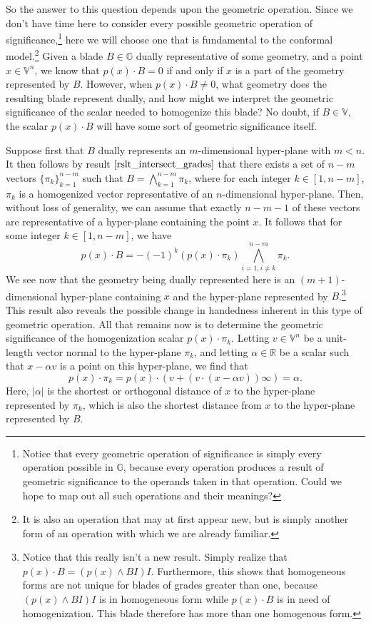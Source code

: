 \documentclass[12pt]{article}
\newcommand{\G}{\mathbb{G}}
\newcommand{\V}{\mathbb{V}}
\newcommand{\R}{\mathbb{R}}
\newcommand{\nvai}{\infty}
\begin{document}
So the answer to this question depends upon the geometric operation.
Since we don't have time here to consider every possible geometric
operation of significance,\footnote{Notice that every geometric operation
of significance is simply every operation possible in $\G$, because every operation
produces a result of geometric significance to the operands taken in that operation.
Could we hope to map out all such operations and their meanings?}
here we will choose one that is fundamental
to the conformal model.\footnote{It is also an operation that may at
first appear new, but is simply another form of an operation with which we
are already familiar.}
Given a blade $B\in\G$ dually representative
of some geometry, and a point $x\in\V^n$, we know that $p(x)\cdot B=0$
if and only if $x$ is a part of the geometry represented by $B$.  However,
when $p(x)\cdot B\neq 0$, what geometry does the resulting blade represent dually,
and how might we interpret the geometric significance of the scalar needed to
homogenize this blade?  No doubt, if $B\in\V$, the scalar $p(x)\cdot B$ will
have some sort of geometric significance itself.

Suppose first that $B$ dually represents an $m$-dimensional
hyper-plane with $m<n$.  It then follows by result $\eqref{rslt_intersect_grades}$
that there exists a set of $n-m$ vectors $\{\pi_k\}_{k=1}^{n-m}$
such that $B=\bigwedge_{k=1}^{n-m}\pi_k$, where for each integer
$k\in[1,n-m]$, $\pi_k$ is a homogenized vector representative
of an $n$-dimensional hyper-plane.  Then, without loss of generality,
we can assume that exactly $n-m-1$ of these vectors are representative
of a hyper-plane containing the point $x$.
It follows that for some integer $k\in[1,n-m]$, we have
\begin{equation*}
p(x)\cdot B = -(-1)^k (p(x)\cdot \pi_k)\bigwedge_{i=1,i\neq k}^{n-m} \pi_k.
\end{equation*}
We see now that the geometry being dually represented here is an
$(m+1)$-dimensional hyper-plane containing $x$ and
the hyper-plane represented by $B$.\footnote{Notice that this really isn't a new result.
Simply realize that $p(x)\cdot B = (p(x)\wedge BI)I$.  Furthermore, this shows that
homogeneous forms are not unique for blades of grades greater than one, because $(p(x)\wedge BI)I$ is in homogeneous
form while $p(x)\cdot B$ is in need of homogenization.  This blade therefore has more than one homogenous form.}
This result also reveals the possible
change in handedness inherent in this type of geometric operation.  All that remains now is to determine
the geometric significance of the homogenization scalar $p(x)\cdot\pi_k$.
Letting $v\in\V^n$ be a unit-length vector
normal to the hyper-plane $\pi_k$, and letting $\alpha\in\R$ be a scalar such that
$x-\alpha v$ is a point on this hyper-plane, we find that
\begin{equation*}
p(x)\cdot\pi_k = p(x)\cdot(v+(v\cdot(x-\alpha v))\nvai) = \alpha.
\end{equation*}
Here, $|\alpha|$ is the shortest or orthogonal distance
of $x$ to the hyper-plane represented by $\pi_k$, which is also the shortest distance
from $x$ to the hyper-plane represented by $B$.
\end{document}
